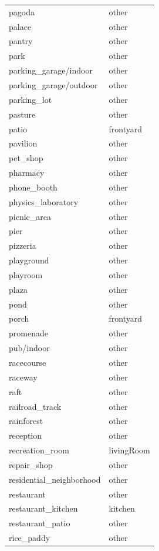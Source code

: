 \begin{table}[h!]
\begin{tabular}{| l | l |}
		pagoda &        other \\
		palace &        other \\
		pantry &        other \\
		park &        other \\
		parking\_garage/indoor &        other \\
		parking\_garage/outdoor &        other \\
		parking\_lot &        other \\
		pasture &        other \\
		patio &    frontyard \\
		pavilion &        other \\
		pet\_shop &        other \\
		pharmacy &        other \\
		phone\_booth &        other \\
		physics\_laboratory &        other \\
		picnic\_area &        other \\
		pier &        other \\
		pizzeria &        other \\
		playground &        other \\
		playroom &        other \\
		plaza &        other \\
		pond &        other \\
		porch &    frontyard \\
		promenade &        other \\
		pub/indoor &        other \\
		racecourse &        other \\
		raceway &        other \\
		raft &        other \\
		railroad\_track &        other \\
		rainforest &        other \\
		reception &        other \\
		recreation\_room &   livingRoom \\
		repair\_shop &        other \\
		residential\_neighborhood &        other \\
		restaurant &        other \\
		restaurant\_kitchen &      kitchen \\
		restaurant\_patio &        other \\
		rice\_paddy &        other \\

\end{tabular}
\end{table}
